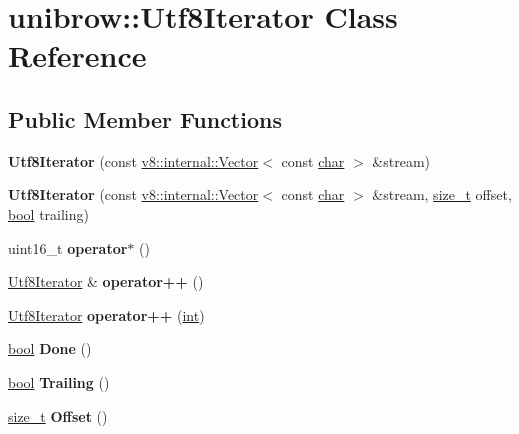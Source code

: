 \hypertarget{classunibrow_1_1Utf8Iterator}{}\section{unibrow\+:\+:Utf8\+Iterator Class Reference}
\label{classunibrow_1_1Utf8Iterator}
\subsection*{Public Member Functions}
\begin{DoxyCompactItemize}
\item 
\mbox{\label{classunibrow_1_1Utf8Iterator_a8d1886563de90ef9bc474db3434648a1}} 
{\bfseries Utf8\+Iterator} (const \mbox{\hyperlink{classv8_1_1internal_1_1Vector}{v8\+::internal\+::\+Vector}}$<$ const \mbox{\hyperlink{classchar}{char}} $>$ \&stream)
\item 
\mbox{\label{classunibrow_1_1Utf8Iterator_aa59c4bb42e4c44fd0231a5d8cd0c869f}} 
{\bfseries Utf8\+Iterator} (const \mbox{\hyperlink{classv8_1_1internal_1_1Vector}{v8\+::internal\+::\+Vector}}$<$ const \mbox{\hyperlink{classchar}{char}} $>$ \&stream, \mbox{\hyperlink{classsize__t}{size\+\_\+t}} offset, \mbox{\hyperlink{classbool}{bool}} trailing)
\item 
\mbox{\label{classunibrow_1_1Utf8Iterator_aae14ce1e26d2ffa88274911a6ac850f1}} 
uint16\+\_\+t {\bfseries operator$\ast$} ()
\item 
\mbox{\label{classunibrow_1_1Utf8Iterator_a4de32d2d27eea7a78d0b4d706836a28b}} 
\mbox{\hyperlink{classunibrow_1_1Utf8Iterator}{Utf8\+Iterator}} \& {\bfseries operator++} ()
\item 
\mbox{\label{classunibrow_1_1Utf8Iterator_a82c7b12c17a3d4509ac70fb8c228fe55}} 
\mbox{\hyperlink{classunibrow_1_1Utf8Iterator}{Utf8\+Iterator}} {\bfseries operator++} (\mbox{\hyperlink{classint}{int}})
\item 
\mbox{\label{classunibrow_1_1Utf8Iterator_a6f440d4d1a8ce5964fa5954de2ccaa88}} 
\mbox{\hyperlink{classbool}{bool}} {\bfseries Done} ()
\item 
\mbox{\label{classunibrow_1_1Utf8Iterator_a9e3f802a6e99f0d8695a1a4ec76ee6e1}} 
\mbox{\hyperlink{classbool}{bool}} {\bfseries Trailing} ()
\item 
\mbox{\label{classunibrow_1_1Utf8Iterator_a229ce023cd6c164d0ff01dc8f9cc1655}} 
\mbox{\hyperlink{classsize__t}{size\+\_\+t}} {\bfseries Offset} ()
\end{DoxyCompactItemize}


